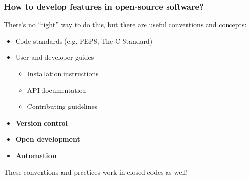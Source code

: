\begin{frame}[t]
    \frametitle{How to develop features in open-source software?}

    There's no ``right'' way to do this, but there are useful conventions and concepts:
    \begin{itemize}
        \item Code standards (e.g. PEP8, The C Standard)
        \item User and developer guides
        \begin{itemize}
            \item Installation instructions
            \item API documentation
            \item Contributing guidelines
        \end{itemize}
        \item {\bf Version control}
        \item {\bf Open development}
        \item {\bf Automation}
    \end{itemize}
    These conventions and practices work in closed codes as well!
\end{frame}
